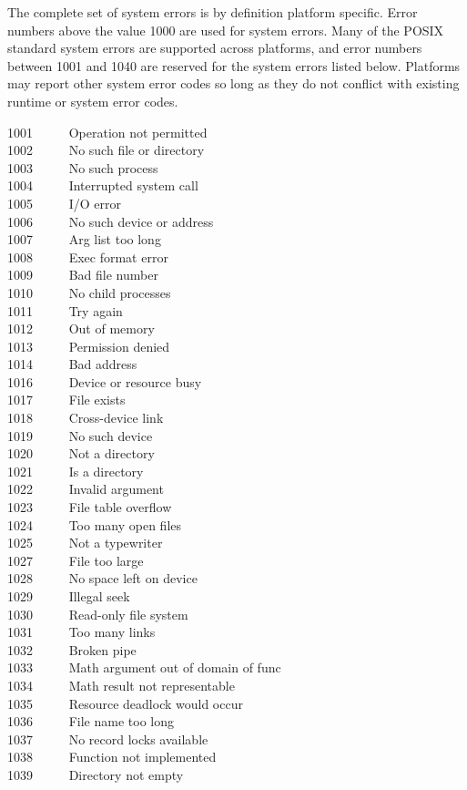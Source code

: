 The complete set of system errors is by definition platform
specific. Error numbers above the value 1000 are used for system errors. Many of
the POSIX standard system errors are supported across platforms, and error
numbers between 1001 and 1040 are reserved for the system errors listed
below. Platforms may report other system error codes so long as they do not
conflict with existing runtime or system error codes.

1001 \ \ \ \ \ Operation not permitted\\
1002 \ \ \ \ \ No such file or directory\\
1003 \ \ \ \ \ No such process\\
1004 \ \ \ \ \ Interrupted system call\\
1005 \ \ \ \ \ I/O error\\
1006 \ \ \ \ \ No such device or address\\
1007 \ \ \ \ \ Arg list too long\\
1008 \ \ \ \ \ Exec format error\\
1009 \ \ \ \ \ Bad file number\\
1010 \ \ \ \ \ No child processes\\
1011 \ \ \ \ \ Try again\\
1012 \ \ \ \ \ Out of memory\\
1013 \ \ \ \ \ Permission denied\\
1014 \ \ \ \ \ Bad address\\
1016 \ \ \ \ \ Device or resource busy\\
1017 \ \ \ \ \ File exists\\
1018 \ \ \ \ \ Cross-device link\\
1019 \ \ \ \ \ No such device\\
1020 \ \ \ \ \ Not a directory\\
1021 \ \ \ \ \ Is a directory\\
1022 \ \ \ \ \ Invalid argument\\
1023 \ \ \ \ \ File table overflow\\
1024 \ \ \ \ \ Too many open files\\
1025 \ \ \ \ \ Not a typewriter\\
1027 \ \ \ \ \ File too large\\
1028 \ \ \ \ \ No space left on device\\
1029 \ \ \ \ \ Illegal seek\\
1030 \ \ \ \ \ Read-only file system\\
1031 \ \ \ \ \ Too many links\\
1032 \ \ \ \ \ Broken pipe\\
1033 \ \ \ \ \ Math argument out of domain of func\\
1034 \ \ \ \ \ Math result not representable\\
1035 \ \ \ \ \ Resource deadlock would occur\\
1036 \ \ \ \ \ File name too long\\
1037 \ \ \ \ \ No record locks available\\
1038 \ \ \ \ \ Function not implemented\\
1039 \ \ \ \ \ Directory not empty

